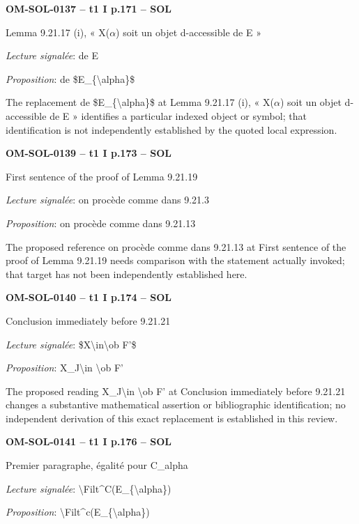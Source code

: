 \par\noindent\textbf{OM-SOL-0137 -- t1 I p.171 -- SOL}\par
Lemma 9.21.17 (i), « X(\ensuremath{\alpha}) soit un objet d-accessible de E »\par
\emph{Lecture signalée}: de E\par
\emph{Proposition}: de \$E\_\{\textbackslash{}alpha\}\$\par
The replacement de \$E\_\{\textbackslash{}alpha\}\$ at Lemma 9.21.17 (i), « X(\ensuremath{\alpha}) soit un objet d-accessible de E » identifies a particular indexed object or symbol; that identification is not independently established by the quoted local expression.\par
\par\noindent\textbf{OM-SOL-0139 -- t1 I p.173 -- SOL}\par
First sentence of the proof of Lemma 9.21.19\par
\emph{Lecture signalée}: on procède comme dans 9.21.3\par
\emph{Proposition}: on procède comme dans 9.21.13\par
The proposed reference on procède comme dans 9.21.13 at First sentence of the proof of Lemma 9.21.19 needs comparison with the statement actually invoked; that target has not been independently established here.\par
\par\noindent\textbf{OM-SOL-0140 -- t1 I p.174 -- SOL}\par
Conclusion immediately before 9.21.21\par
\emph{Lecture signalée}: \$X\textbackslash{}in\textbackslash{}ob F'\$\par
\emph{Proposition}: X\_J\textbackslash{}in \textbackslash{}ob F'\par
The proposed reading X\_J\textbackslash{}in \textbackslash{}ob F' at Conclusion immediately before 9.21.21 changes a substantive mathematical assertion or bibliographic identification; no independent derivation of this exact replacement is established in this review.\par
\par\noindent\textbf{OM-SOL-0141 -- t1 I p.176 -- SOL}\par
Premier paragraphe, égalité pour C\_alpha\par
\emph{Lecture signalée}: \textbackslash{}Filt\textasciicircum{}C(E\_\{\textbackslash{}alpha\})\par
\emph{Proposition}: \textbackslash{}Filt\textasciicircum{}c(E\_\{\textbackslash{}alpha\})\par
